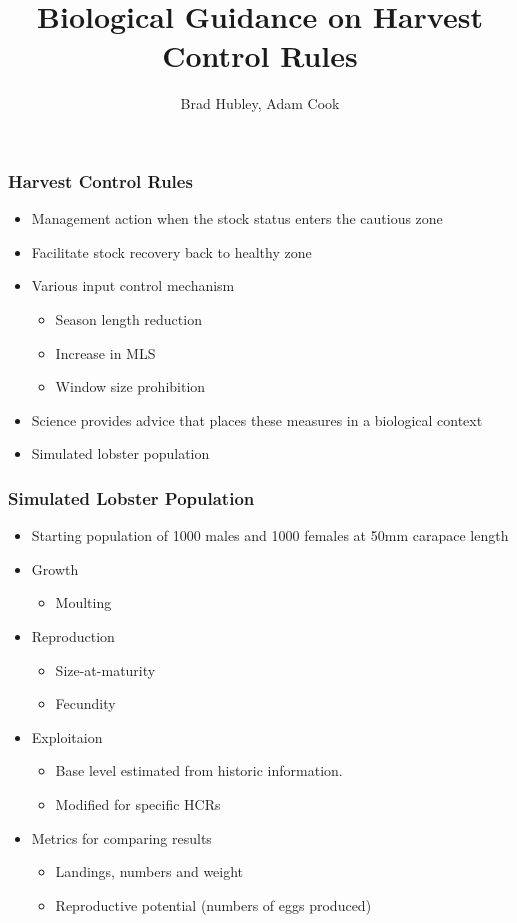 \documentclass{beamer}
\title[HCR Guidance]{Biological Guidance on Harvest Control Rules}
\author[Hubley and Cook]{Brad Hubley, Adam Cook}
\institute[DFO]{Science Branch, Fisheries and Oceans Canada}
\date{}
\begin{document}
 
\frame{\titlepage}
 

\begin{frame}
\frametitle{Harvest Control Rules}

\begin{itemize}
\item Management action when the stock status enters the cautious zone 
\item Facilitate stock recovery back to healthy zone 
\item Various input control mechanism
\begin{itemize}
\item Season length reduction
\item Increase in MLS
\item Window size prohibition
\end{itemize}
\item Science provides advice that places these measures in a biological context 
\item Simulated lobster population
\end{itemize}

\end{frame}


\begin{frame}
\frametitle{Simulated Lobster Population}
    \begin{itemize}
    \item Starting population of 1000 males and 1000 females at 50mm carapace length 
    \item Growth 
    \begin{itemize}
        \item Moulting
    \end{itemize}
    \item Reproduction
    \begin{itemize}
        \item Size-at-maturity
        \item Fecundity
    \end{itemize}
    \item Exploitaion
    \begin{itemize}
        \item Base level estimated from historic information.
        \item Modified for specific HCRs
    \end{itemize}
    \item Metrics for comparing results
    \begin{itemize}
        \item Landings, numbers and weight
        \item Reproductive potential (numbers of eggs produced)
    \end{itemize}
    \end{itemize}
\end{frame}
\end{document}
